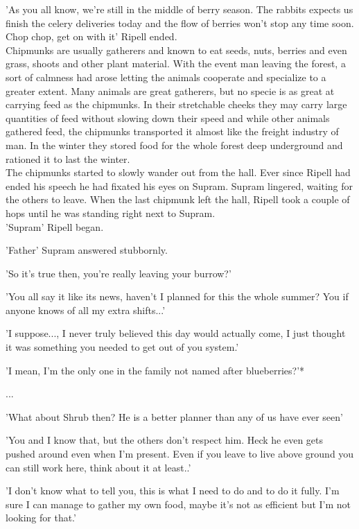 \documentclass[smalldemyvopaper,11pt,twoside,onecolumn,openright,extrafontsizes]{memoir}
\begin{document}
'As you all know, we're still in the middle of berry season. The rabbits expects us finish the celery deliveries today and the flow of berries won't stop any time soon. Chop chop, get on with it' Ripell ended. \\

Chipmunks are usually gatherers and known to eat seeds, nuts, berries and even grass, shoots and other plant material. With the event man leaving the forest, a sort of calmness had arose letting the animals cooperate and specialize to a greater extent. Many animals are great gatherers, but no specie is as great at carrying feed as the chipmunks. In their stretchable cheeks they may carry large quantities of feed without slowing down their speed and while other animals gathered feed, the chipmunks transported it almost like the freight industry of man. In the winter they stored food for the whole forest deep underground and rationed it to last the winter. \\

The chipmunks started to slowly wander out from the hall. Ever since Ripell had ended his speech he had fixated his eyes on Supram. Supram lingered, waiting for the others to leave. When the last chipmunk left the hall, Ripell took a couple of hops until he was standing right next to Supram.\\

'Supram' Ripell began.

'Father' Supram answered stubbornly.

'So it's true then, you're really leaving your burrow?'

'You all say it like its news, haven't I planned for this the whole summer? You if anyone knows of all my extra shifts...'

'I suppose..., I never truly believed this day would actually come, I just thought it was something you needed to get out of you system.'

'I mean, I'm the only one in the family not named after blueberries?'*

...

'What about Shrub then? He is a better planner than any of us have ever seen'

'You and I know that, but the others don't respect him. Heck he even gets pushed around even when I'm present.
Even if you leave to live above ground you can still work here, think about it at least..'

'I don't know what to tell you, this is what I need to do and to do it fully. I'm sure I can manage to gather my own food, maybe it's not as efficient but I'm not looking for that.'
\end{document}
